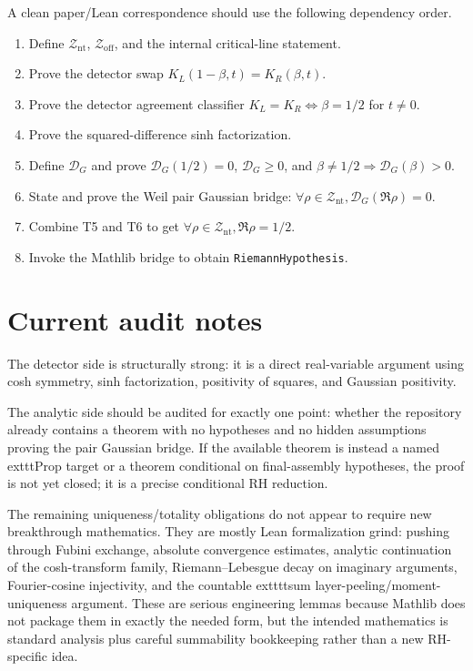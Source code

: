 \documentclass[11pt]{article}
\newcommand{\NTZ}{\mathcal Z_{\mathrm{nt}}}
\newcommand{\OLZ}{\mathcal Z_{\mathrm{off}}}
\newcommand{\gpdef}{\mathcal D_G}
\newcommand{\KL}{K_L}
\newcommand{\KR}{K_R}
\begin{document}
A clean paper/Lean correspondence should use the following dependency order.

\begin{enumerate}[label=\textbf{T\arabic*.},leftmargin=3em]
  \item Define \(\NTZ\), \(\OLZ\), and the internal critical-line statement.
  \item Prove the detector swap \(\KL(1-\beta,t)=\KR(\beta,t)\).
  \item Prove the detector agreement classifier \(\KL=\KR\iff\beta=1/2\) for \(t\ne0\).
  \item Prove the squared-difference sinh factorization.
  \item Define \(\gpdef\) and prove \(\gpdef(1/2)=0\), \(\gpdef\ge0\), and
        \(\beta\ne1/2\Rightarrow\gpdef(\beta)>0\).
  \item State and prove the Weil pair Gaussian bridge:
        \(\forall\rho\in\NTZ,\gpdef(\Re\rho)=0\).
  \item Combine T5 and T6 to get \(\forall\rho\in\NTZ,\Re\rho=1/2\).
  \item Invoke the Mathlib bridge to obtain \texttt{RiemannHypothesis}.
\end{enumerate}

\section{Current audit notes}

The detector side is structurally strong: it is a direct real-variable argument using
cosh symmetry, sinh factorization, positivity of squares, and Gaussian positivity.

The analytic side should be audited for exactly one point: whether the repository already
contains a theorem with no hypotheses and no hidden assumptions proving the pair Gaussian
bridge.  If the available theorem is instead a named 	exttt{Prop} target or a theorem
conditional on final-assembly hypotheses, the proof is not yet closed; it is a precise
conditional RH reduction.

The remaining uniqueness/totality obligations do not appear to require new breakthrough
mathematics.  They are mostly Lean formalization grind: pushing through Fubini exchange,
absolute convergence estimates, analytic continuation of the cosh-transform family,
Riemann--Lebesgue decay on imaginary arguments, Fourier-cosine injectivity, and the
countable 	exttt{tsum} layer-peeling/moment-uniqueness argument.  These are serious
engineering lemmas because Mathlib does not package them in exactly the needed form, but
the intended mathematics is standard analysis plus careful summability bookkeeping rather
than a new RH-specific idea.
\end{document}
